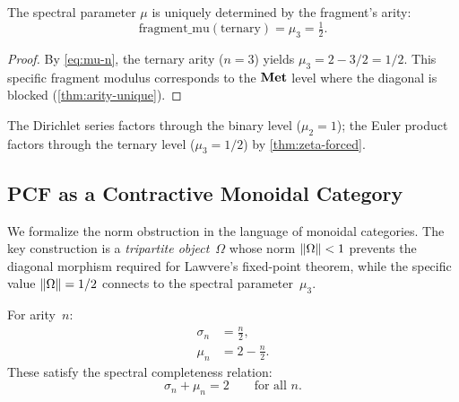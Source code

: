 \begin{proposition}\label{prop:fragment-mu}
The spectral parameter $\mu$ is uniquely determined by the fragment's arity:
\begin{equation}\label{eq:fragment-mu-ternary}
  \mathrm{fragment\_mu}(\mathrm{ternary}) = \mu_3 = \tfrac{1}{2}.
\end{equation}
\end{proposition}

\begin{proof}
By \cref{eq:mu-n}, the ternary arity ($n=3$) yields $\mu_3 = 2 - 3/2 = 1/2$. This specific fragment modulus corresponds to the $\mathbf{Met}$ level where the diagonal is blocked (\cref{thm:arity-unique}).
\end{proof}

\begin{remark}
The Dirichlet series factors through the binary level ($\mu_2=1$);
the Euler product factors through the ternary level ($\mu_3=1/2$)
by \cref{thm:zeta-forced}.
\end{remark}


\subsection{PCF as a Contractive Monoidal Category}\label{ssec:CM-cat}

We formalize the norm obstruction in the language of monoidal categories.
The key construction is a \emph{tripartite object}~$\Omega$ whose norm
$\|\Omega\|<1$ prevents the diagonal morphism required for Lawvere's
fixed-point theorem, while the specific value $\|\Omega\|=1/2$ connects
to the spectral parameter~$\mu_3$.


\begin{definition}\label{def:spectral-params}%
  \label{ssec:spectral-params}
For arity~$n$:
\begin{align}
  \sigma_n &= \frac{n}{2},
    \label{eq:sigma-n}  \\
  \mu_n &= 2 - \frac{n}{2}.
    \label{eq:mu-n}
\end{align}
These satisfy the spectral completeness relation:
\begin{equation}\label{eq:spectral-completeness}
  \sigma_n + \mu_n = 2 \qquad\text{for all } n.
\end{equation}
\end{definition}

